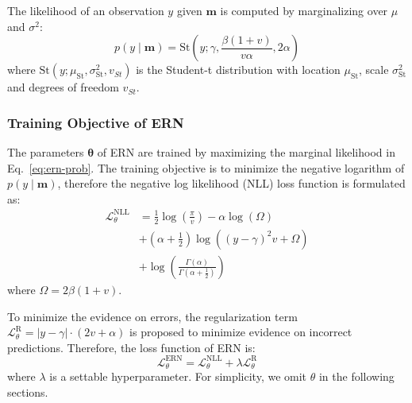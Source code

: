 The likelihood of an observation $y$ given $\boldsymbol{m}$ is computed by marginalizing over $\mu$ and $\sigma^2$:
\begin{equation}
\label{eq:ern-prob}
p\left(y \mid \boldsymbol{m}\right) 
=\mathrm{St}\left(y ; \gamma, \frac{\beta(1+v)}{v \alpha}, 2 \alpha\right)
\end{equation}
where $\mathrm{St}\left(y ; \mu_{\mathrm{St}}, \sigma_{\mathrm{St}}^2, v_{S t}\right)$ is the Student-t distribution with location $\mu_{\mathrm{St}}$, scale $\sigma_{\mathrm{St}}^2$ and degrees of freedom $v_{S t}$.

\subsubsection{Training Objective of ERN}
The parameters $\boldsymbol{\theta}$ of ERN are trained by maximizing the marginal likelihood in Eq.~\ref{eq:ern-prob}. The training objective is to minimize the negative logarithm of $p\left(y \mid \boldsymbol{m}\right)$, therefore the negative log likelihood (NLL) loss function is formulated as:
\begin{equation}
\begin{aligned}
\mathcal{L}_{{\theta}}^{\mathrm{NLL}}&=\frac{1}{2} \log \left(\frac{\pi}{v}\right)-\alpha \log (\Omega) \\
&+\left(\alpha+\frac{1}{2}\right) \log \left(\left(y-\gamma\right)^2 v +\Omega\right) \\
&+\log \left(\frac{\Gamma(\alpha)}{\Gamma\left(\alpha+\frac{1}{2}\right)}\right)
\end{aligned}
\end{equation}
where $\Omega=2 \beta(1+v)$.

To minimize the evidence on errors, the regularization term $\mathcal{L}_{\theta}^{\mathrm{R}} = \left|y-\gamma\right| \cdot(2 v+\alpha)$ is proposed to minimize evidence on incorrect predictions. Therefore, the loss function of ERN is:
\begin{equation}
\label{eq:ern-loss}
    \mathcal{L}_{\theta}^{\mathrm{ERN}} = \mathcal{L}_{{\theta}}^{\mathrm{NLL}} + \lambda \mathcal{L}_{\theta}^{\mathrm{R}}
\end{equation}
where $\lambda$ is a settable hyperparameter. For simplicity, we omit $\theta$ in the following sections.


